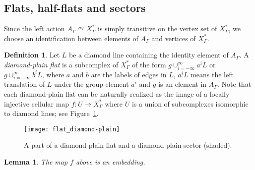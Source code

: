\documentclass[11pt]{amsart}
\newtheorem{lemma}[theorem]{Lemma}
\theoremstyle{definition}
\newtheorem{definition}[theorem]{Definition}
\newcommand{\act}{\curvearrowright}
\newcommand{\Xa}{X^{\ast}}
\begin{document}
\subsection{Flats, half-flats and sectors}
\label{subsec:atomic sector}
Since the left action $A_\Gamma\act \Xa_\Gamma$ is simply transitive on the vertex set of $\Xa_\Gamma$, we choose an identification between elements of $A_\Gamma$ and vertices of $\Xa_\Gamma$.

\begin{definition}
	\label{def:diamond-plain flat}
Let $L$ be a diamond line containing the identity element of $A_\Gamma$. A \emph{diamond-plain flat} is a subcomplex of $\Xa_\Gamma$ of the form $g\cup_{i=-\infty}^{\infty} a^i L$ or $g\cup_{i=-\infty}^{\infty} b^i L$, where $a$ and $b$ are the labels of edges in $L$, $a^i L$ means the left translation of $L$ under the group element $a^i$ and $g$ is an element in $A_\Gamma$. Note that each diamond-plain flat can be naturally realized as the image of a locally injective cellular map $f\colon U\to \Xa_\Gamma$ where $U$ is a union of subcomplexes isomorphic to diamond lines; see Figure~\ref{f:flat_diamond-plain}.
\end{definition}

\begin{figure}[h!]
	\centering
	\texttt{[image: flat\_diamond-plain]}
	\caption{A part of a diamond-plain flat and a diamond-plain sector (shaded).}
	\label{f:flat_diamond-plain}
\end{figure}

\begin{lemma}
	\label{lem:diamond embedding}
The map $f$ above is an embedding.
\end{lemma}
\end{document}
